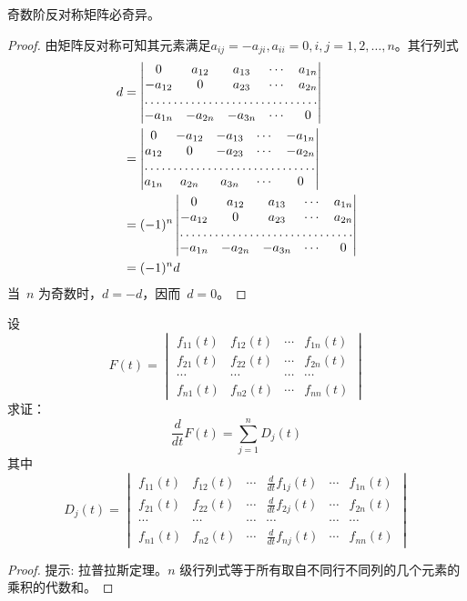 \documentclass[twoside,openright]{book}
\begin{document}
\begin{CJK*}{UTF8}{}
\begin{quest}
\label{quest:69}
奇数阶反对称矩阵必奇异。
\end{quest}
\begin{proof}
由矩阵反对称可知其元素满足$a_{ij}=-a_{ji}, a_{ii}=0, i,j=1,2,\dotsc,n$。其行列式
\[
\begin{aligned}
d &=\begin{vmatrix}
0       & a_{12} & a_{13} & \dotsm & a_{1n} \\
-a_{12} & 0      & a_{23} & \dotsm & a_{2n} \\
\hdotsfor{5} \\
-a_{1n} & -a_{2n} & -a_{3n} & \dotsm & 0
\end{vmatrix} \\
& =\begin{vmatrix}
0       & -a_{12} & -a_{13} & \dotsm & -a_{1n} \\
a_{12}  & 0       & -a_{23} & \dotsm & -a_{2n} \\
\hdotsfor{5} \\
a_{1n} & a_{2n} & a_{3n} & \dotsm & 0
\end{vmatrix} \\
& =(-1)^n \begin{vmatrix}
0       & a_{12} & a_{13} & \dotsm & a_{1n} \\
-a_{12} & 0      & a_{23} & \dotsm & a_{2n} \\
\hdotsfor{5} \\
-a_{1n} & -a_{2n} & -a_{3n} & \dotsm & 0
\end{vmatrix}\\
& =(-1)^nd
\end{aligned}
\]
当\ $n$ 为奇数时，$d=-d$，因而\ $d=0$。
\end{proof}

\begin{quest}
\label{quest:70}
设
\[
F(t) =
\begin{vmatrix}
f_{11}(t) & f_{12}(t) & \dotsm & f_{1n}(t) \\
f_{21}(t) & f_{22}(t) & \dotsm & f_{2n}(t) \\
\dotsm    & \dotsm    & \dotsm & \dotsm    \\
f_{n1}(t) & f_{n2}(t) & \dotsm & f_{nn}(t)
\end{vmatrix}
\]
求证：
\[
\frac{d}{dt} F(t) = \sum_{j=1}^n D_j (t)
\]
其中
\[
D_j (t) =
\begin{vmatrix}
f_{11}(t) & f_{12}(t) & \dotsm & \displaystyle{\frac{d}{dt} f_{1j}(t)} & \dotsm & f_{1n}(t) \\
f_{21}(t) & f_{22}(t) & \dotsm & \displaystyle{\frac{d}{dt} f_{2j}(t)} & \dotsm & f_{2n}(t) \\
\dotsm    & \dotsm    & \dotsm & \dotsm                                & \dotsm & \dotsm    \\
f_{n1}(t) & f_{n2}(t) & \dotsm & \displaystyle{\frac{d}{dt} f_{nj}(t)} & \dotsm & f_{nn}(t)
\end{vmatrix}
\]
\end{quest}
\begin{proof}
{\color{red}提示: 拉普拉斯定理。$n$ 级行列式等于所有取自不同行不同列的几个元素的乘积的代数和。}


\end{proof}
\end{CJK*}
\end{document}

